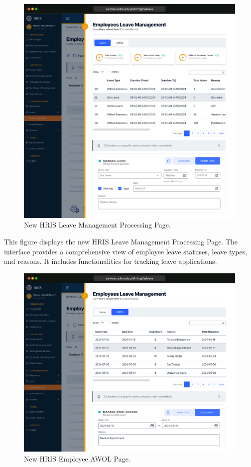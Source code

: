     \begin{figure}[H]
        \centering
        \includegraphics[width=1\linewidth]{figures/app/leave-mgt.png}
        \caption{New HRIS Leave Management Processing Page.}
        \label{fig:leave-mgt}
    \end{figure}

    This figure displays the new HRIS Leave Management Processing Page. The interface provides a comprehensive view of employee leave statuses, leave types, and reasons. It includes functionalities for tracking leave applications.

    \begin{figure}[H]
        \centering
        \includegraphics[width=1\linewidth]{figures/app/leave-awol.png}
        \caption{New HRIS Employee AWOL Page.}
        \label{fig:leave-awol}
    \end{figure}

